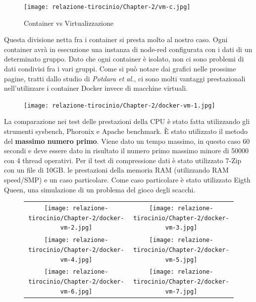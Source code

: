\documentclass[a4paper,10pt]{memoir}
\begin{document}
\begin{figure}[ht]
\caption{Container vs Virtualizzazione}
\texttt{[image: relazione-tirocinio/Chapter-2/vm-c.jpg]}
\end{figure}
Questa divisione netta fra i container si presta molto al nostro caso. Ogni container avrà in esecuzione una instanza di node-red configurata con i dati di un determinato gruppo.
Dato che ogni container è isolato, non ci sono problemi di dati condivisi fra i vari gruppi.
Come si può notare dai grafici nelle prossime pagine, tratti dallo studio di \textit{Potdara et al.}\cite{dockervsvm}, ci sono molti vantaggi prestazionali nell'utilizzare i container Docker invece di macchine virtuali.

\begin{figure}
    \texttt{[image: relazione-tirocinio/Chapter-2/docker-vm-1.jpg]}
    \label{fig:docker-vm-1}
\end{figure}
La comparazione nei test delle prestazioni della CPU è stato fatta utilizzando gli strumenti sysbench, Phoronix e Apache benchmark. È stato utilizzato il metodo del \textbf{massimo numero primo}.
Viene dato un tempo massimo, in questo caso 60 secondi e deve essere dato in risultato il numero primo massimo minore di 50000 con 4 thread operativi.
Per il test di compressione dati è stato utilizzato 7-Zip con un file di 10GB.
le prestazioni della memoria RAM (utilizzando RAM speed/SMP) e un caso particolare. Come caso particolare è stato utilizzato Eigth Queen, una simulazione di un problema del gioco degli scacchi. 
\begin{figure}
\begin{tabular}{cc}
  \texttt{[image: relazione-tirocinio/Chapter-2/docker-vm-2.jpg]} &   \texttt{[image: relazione-tirocinio/Chapter-2/docker-vm-3.jpg]} \\
 \texttt{[image: relazione-tirocinio/Chapter-2/docker-vm-4.jpg]} &   \texttt{[image: relazione-tirocinio/Chapter-2/docker-vm-5.jpg]} \\
 \texttt{[image: relazione-tirocinio/Chapter-2/docker-vm-6.jpg]} &   \texttt{[image: relazione-tirocinio/Chapter-2/docker-vm-7.jpg]} \\
\end{tabular}
\end{figure}

\clearpage
\end{document}
